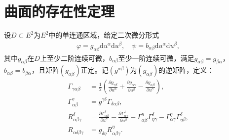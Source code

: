 \documentclass[../../main.tex]{subfiles}%
\begin{document}
\section{曲面的存在性定理}

\begin{definition}
设$D \subset E^2$为$E^2$中的单连通区域，给定二次微分形式
\begin{align}
\varphi = g_{\alpha\beta}\mathrm{d}u^\alpha\mathrm{d}u^\beta,\quad \psi = b_{\alpha\beta}\mathrm{d}u^\alpha\mathrm{d}u^\beta,
\label{eq:::IO22JIOWAIJ2.1}
\end{align}
其中$g_{\alpha\beta}$在$D$上至少二阶连续可微，$b_{\alpha\beta}$至少一阶连续可微，满足$g_{\alpha\beta}=g_{\beta\alpha}$，$b_{\alpha\beta}=b_{\beta\alpha}$，且矩阵$(g_{\alpha\beta})$正定。记$(g^{\alpha\beta})$为$(g_{\alpha\beta})$的逆矩阵，定义：
\begin{align}
\Gamma_{\gamma\alpha\beta} &= \frac{1}{2}\left(\frac{\partial g_{\gamma\beta}}{\partial u^\alpha}+\frac{\partial g_{\alpha\gamma}}{\partial u^\beta}-\frac{\partial g_{\alpha\beta}}{\partial u^\gamma}\right),
\label{eq:::IO22JIOWAIJ2.2}\\
\Gamma^\gamma_{\alpha\beta} &= g^{\gamma\delta}\Gamma_{\delta\alpha\beta},
\label{eq:::IO22JIOWAIJ2.3}\\
R^\delta_{\alpha\beta\gamma} &= \frac{\partial \Gamma^\delta_{\alpha\beta}}{\partial u^\gamma}-\frac{\partial \Gamma^\delta_{\alpha\gamma}}{\partial u^\beta}+\Gamma^\eta_{\alpha\beta}\Gamma^\delta_{\eta\gamma}-\Gamma^\eta_{\alpha\gamma}\Gamma^\delta_{\eta\beta},
\label{eq:::IO22JIOWAIJ2.4}\\
R_{\alpha\delta\beta\gamma} &= g_{\delta\eta}R^\eta_{\alpha\beta\gamma}.
\label{eq:::IO22JIOWAIJ2.5}
\end{align}
\end{definition}
\end{document}
